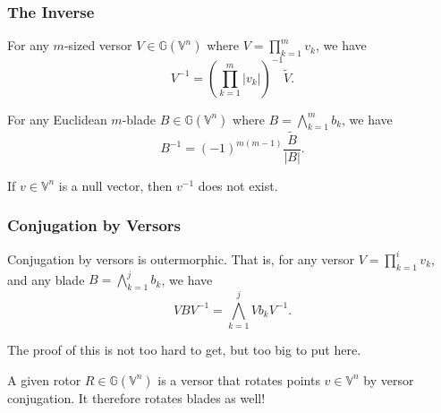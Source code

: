 \documentclass{beamer}
\newcommand{\G}{\mathbb{G}}
\newcommand{\V}{\mathbb{V}}
\begin{document}
\begin{frame}
\frametitle{The Inverse}
\begin{lemma}
For any $m$-sized versor $V\in\G(\V^n)$ where $V=\prod_{k=1}^m v_k$, we have
\begin{equation*}
V^{-1} = \left(\prod_{k=1}^m |v_k|\right)^{-1}\tilde{V}.
\end{equation*}
\end{lemma}
\begin{lemma}
For any \alert{Euclidean} $m$-blade $B\in\G(\V^n)$ where $B=\bigwedge_{k=1}^m b_k$, we have
\begin{equation*}
B^{-1} = (-1)^{m(m-1)}\frac{\tilde{B}}{|B|}.
\end{equation*}
\end{lemma}
\begin{example}
If $v\in\V^n$ is a null vector, then $v^{-1}$ does not exist.
\end{example}
\end{frame}

\begin{frame}
\frametitle{Conjugation by Versors}
\begin{lemma}
Conjugation by versors is outermorphic.  That is, for any versor $V=\prod_{k=1}^i v_k$,
and any blade $B=\bigwedge_{k=1}^j b_k$, we have
\begin{equation*}
VBV^{-1} = \bigwedge_{k=1}^j Vb_kV^{-1}.
\end{equation*}
\end{lemma}
The proof of this is not too hard to get, but too big to put here.
\begin{example}
A given rotor $R\in\G(\V^n)$ is a versor that rotates points $v\in\V^n$
by versor conjugation.  It therefore rotates blades as well!
\end{example}
\end{frame}
\end{document}
